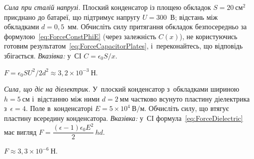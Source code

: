 \begin{problem}\label{prb:ForceConstPhi}
	\emph{Сила при сталій напрузі.} Плоский конденсатор із площею обкладок $S=20\
	\text{см}^2$ приєднано до батареї, що підтримує напругу $U=300$~В; відстань між
	обкладками $d=0{,}5$~мм. Обчисліть силу притягання обкладок безпосередньо за
	формулою~\eqref{eq:ForceConstPhiE} (через залежність $C(x)$), не користуючись готовим
	результатом~\eqref{eq:ForceCapacitorPlates}, і~переконайтесь, що відповідь збігається.
	\emph{Вказівка:} у~СІ $C=\epsilon_0S/x$.
	\begin{solution}
		$F=\epsilon_0SU^2/2d^2\approx 3{,}2\times10^{-3}\ \text{Н}$.
	\end{solution}
\end{problem}

\begin{problem}\label{prb:DielectricForce}
	\emph{Сила, що діє на діелектрик.} У~плоский конденсатор з~обкладками шириною $h = 5\
	\text{см}$ і~відстанню між ними $d = 2\ \text{мм}$ частково всунуто пластину
	діелектрика з~$\epsilon = 4$. Поле в~конденсаторі $E = 5\times 10^4\ \text{В/м}$.
	Обчисліть силу, що втягує пластину всередину конденсатора. \emph{Вказівка:} у~СІ
	формула~\eqref{eq:ForceDielectric} має вигляд $F =
	\dfrac{(\epsilon-1)\epsilon_0E^2}{2}\,hd$.
	\begin{solution}
		$F \approx 3{,}3\times 10^{-6}\ \text{Н}$.
	\end{solution}
\end{problem}

